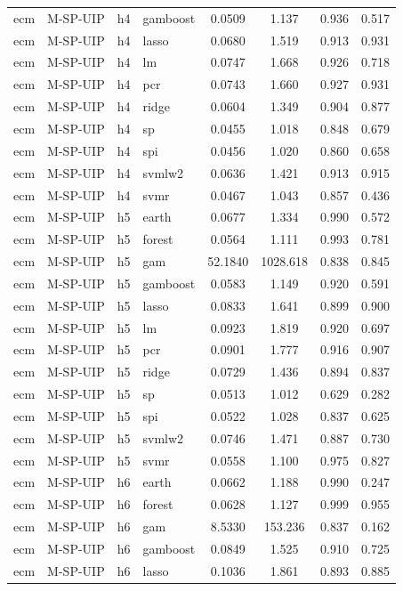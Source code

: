 \begin{ThreePartTable}
\begin{longtable}[t]{llclcccc}
ecm & M-SP-UIP & h4 & gamboost & 0.0509 & 1.137 & 0.936 & 0.517\\
ecm & M-SP-UIP & h4 & lasso & 0.0680 & 1.519 & 0.913 & 0.931\\
ecm & M-SP-UIP & h4 & lm & 0.0747 & 1.668 & 0.926 & 0.718\\
ecm & M-SP-UIP & h4 & pcr & 0.0743 & 1.660 & 0.927 & 0.931\\
ecm & M-SP-UIP & h4 & ridge & 0.0604 & 1.349 & 0.904 & 0.877\\
ecm & M-SP-UIP & h4 & sp & 0.0455 & 1.018 & 0.848 & 0.679\\
ecm & M-SP-UIP & h4 & spi & 0.0456 & 1.020 & 0.860 & 0.658\\
ecm & M-SP-UIP & h4 & svmlw2 & 0.0636 & 1.421 & 0.913 & 0.915\\
ecm & M-SP-UIP & h4 & svmr & 0.0467 & 1.043 & 0.857 & 0.436\\
\addlinespace
ecm & M-SP-UIP & h5 & earth & 0.0677 & 1.334 & 0.990 & 0.572\\
ecm & M-SP-UIP & h5 & forest & 0.0564 & 1.111 & 0.993 & 0.781\\
ecm & M-SP-UIP & h5 & gam & 52.1840 & 1028.618 & 0.838 & 0.845\\
ecm & M-SP-UIP & h5 & gamboost & 0.0583 & 1.149 & 0.920 & 0.591\\
ecm & M-SP-UIP & h5 & lasso & 0.0833 & 1.641 & 0.899 & 0.900\\
ecm & M-SP-UIP & h5 & lm & 0.0923 & 1.819 & 0.920 & 0.697\\
ecm & M-SP-UIP & h5 & pcr & 0.0901 & 1.777 & 0.916 & 0.907\\
ecm & M-SP-UIP & h5 & ridge & 0.0729 & 1.436 & 0.894 & 0.837\\
ecm & M-SP-UIP & h5 & sp & 0.0513 & 1.012 & 0.629 & 0.282\\
ecm & M-SP-UIP & h5 & spi & 0.0522 & 1.028 & 0.837 & 0.625\\
ecm & M-SP-UIP & h5 & svmlw2 & 0.0746 & 1.471 & 0.887 & 0.730\\
ecm & M-SP-UIP & h5 & svmr & 0.0558 & 1.100 & 0.975 & 0.827\\
\addlinespace
ecm & M-SP-UIP & h6 & earth & 0.0662 & 1.188 & 0.990 & 0.247\\
ecm & M-SP-UIP & h6 & forest & 0.0628 & 1.127 & 0.999 & 0.955\\
ecm & M-SP-UIP & h6 & gam & 8.5330 & 153.236 & 0.837 & 0.162\\
ecm & M-SP-UIP & h6 & gamboost & 0.0849 & 1.525 & 0.910 & 0.725\\
ecm & M-SP-UIP & h6 & lasso & 0.1036 & 1.861 & 0.893 & 0.885\\

\end{longtable}
\end{ThreePartTable}
